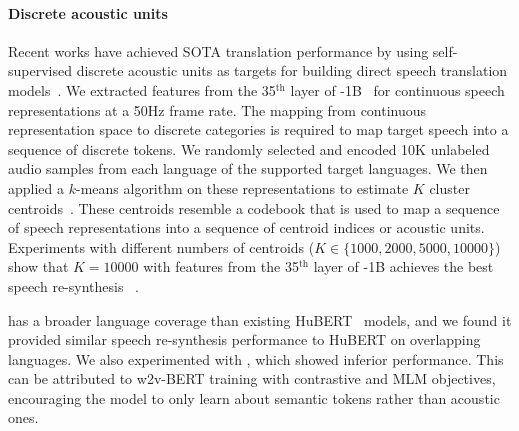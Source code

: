 \paragraph{Discrete acoustic units}
Recent works have achieved SOTA translation performance by using self-supervised discrete acoustic units as targets for building direct speech translation models~\citep{tjandra2019speech,lee-etal-2022-direct,lee-etal-2022-textless,zhang-etal-2022-speechut,chen-etal-2023-speech}. 
We extracted features from the 35$^\text{th}$ layer of \xlsr-1B~\citep{babu2021xls} for continuous speech representations at a 50Hz frame rate.
The mapping from \xlsr continuous representation space to discrete categories is required to map target speech into a sequence of discrete tokens. 
We randomly selected and encoded 10K unlabeled audio samples from each language of the \ntslangs supported target languages.
We then applied a $k$-means algorithm on these representations to estimate $K$ cluster centroids~\citep{lakhotia-etal-2021-generative,polyak21_interspeech,lee-etal-2022-direct}. 
These centroids resemble a codebook that is used to map a sequence of \xlsr speech representations into a sequence of centroid indices or acoustic units.
Experiments with different numbers of centroids ($K\in\{1000, 2000, 5000, 10000\}$) show that $K{=}10000$ with features from the 35$^\text{th}$ layer of \xlsr-1B achieves the best speech re-synthesis \wer~\citep{polyak21_interspeech}.

\xlsr has a broader language coverage than existing HuBERT~\citep{hsu2021hubert} models, and we found it provided similar speech re-synthesis performance to HuBERT on overlapping languages. We also experimented with \wvbert, which showed inferior performance. This can be attributed to w2v-BERT training with contrastive and MLM objectives, encouraging the model to only learn about semantic tokens rather than acoustic ones.

